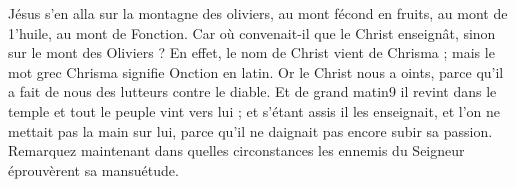 Jésus s’en alla sur la montagne des oliviers, au mont fécond en fruits, au mont de 1’huile, au mont de Fonction. Car où convenait-il que le Christ enseignât, sinon sur le mont des Oliviers ? En effet, le nom de Christ vient de Chrisma ; mais le mot grec Chrisma signifie Onction en latin. Or le Christ nous a oints, parce qu’il a fait de nous des lutteurs contre le diable. Et de grand matin9 il revint dans le temple et tout le peuple vint vers lui ; et s’étant assis il les enseignait, et l’on ne mettait pas la main sur lui, parce qu’il ne daignait pas encore subir sa passion. Remarquez maintenant dans quelles circonstances les ennemis du Seigneur éprouvèrent sa mansuétude.
